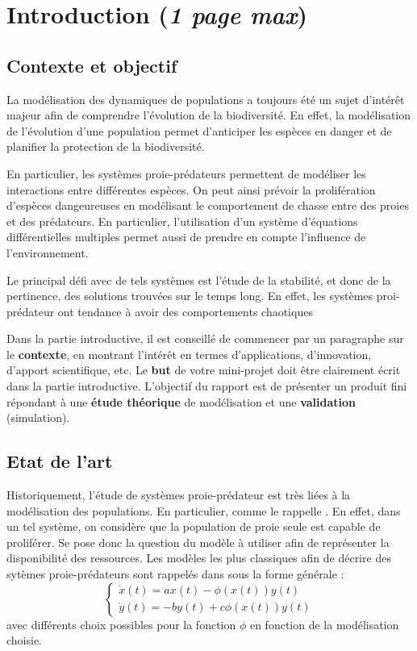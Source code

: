 \chapter{Introduction (\textit{1 page max})}
\label{ch:Introduction}


\section{Contexte et objectif}
\label{sec:Contexte}

La modélisation des dynamiques de populations a toujours été un sujet d'intérêt majeur afin de comprendre l'évolution de la biodiversité. En effet, la modélisation de l'évolution d'une population permet d'anticiper les espèces en danger et de planifier la protection de la biodiversité.

En particulier, les systèmes proie-prédateurs permettent de modéliser les interactions entre différentes espèces. On peut ainsi prévoir la prolifération d'espèces dangeureuses en modélisant le comportement de chasse entre des proies et des prédateurs. En particulier, l'utilisation d'un système d'équations différentielles multiples permet aussi de prendre en compte l'influence de l'environnement.

Le principal défi avec de tels systèmes est l'étude de la stabilité, et donc de la pertinence, des solutions trouvées sur le temps long. En effet, les systèmes proi-prédateur ont tendance à avoir des comportements chaotiques

Dans la partie introductive, il est conseillé de commencer par un paragraphe sur le \textbf{contexte}, en montrant l’intérêt en termes d’applications, d’innovation, d’apport scientifique, etc. Le \textbf{but} de votre mini-projet doit être clairement écrit dans la partie introductive. L’objectif du rapport est de présenter un produit fini répondant à une \textbf{étude théorique} de modélisation et une \textbf{validation} (simulation).

\section{Etat de l’art}
\label{sec:Etat}

Historiquement, l'étude de systèmes proie-prédateur est très liées à la modélisation des populations. En particulier, comme le rappelle \cite{BrauerBiology}. En effet, dans un tel système, on considère que la population de proie seule est capable de proliférer. Se pose donc la question du modèle à utiliser afin de représenter la disponibilité des ressources.
Les modèles les plus classiques afin de décrire des sytèmes proie-prédateurs sont rappelés dans \cite{Holl2stoch} sous la forme générale :
\begin{equation}
    \begin{cases}
        \dot{x}(t) = a x(t) - \phi (x(t)) y(t) \\
        \dot{y}(t) = -b y(t) + c \phi (x(t)) y(t)
    \end{cases}
\end{equation}
avec différents choix possibles pour la fonction $\phi$ en fonction de la modélisation choisie.


